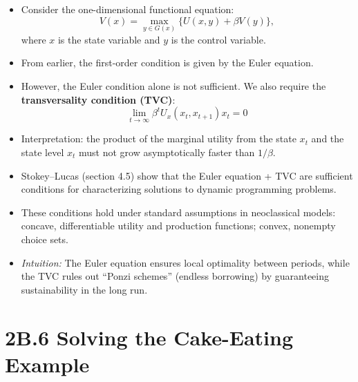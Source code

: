 \documentclass[12pt]{article}
\begin{document}
\begin{itemize}
    \item Consider the one-dimensional functional equation:
    \[
    V(x) = \max_{y \in G(x)} \{ U(x,y) + \beta V(y) \},
    \]
    where \( x \) is the state variable and \( y \) is the control variable.

    \item From earlier, the first-order condition is given by the Euler equation.

    \item However, the Euler condition alone is not sufficient.  
    We also require the \textbf{transversality condition (TVC)}:
    \[
    \lim_{t \to \infty} \beta^t U_x(x_t, x_{t+1}) x_t = 0
    \]

    \item Interpretation: the product of the marginal utility from the state \( x_t \) and the state level \( x_t \) must not grow asymptotically faster than \( 1/\beta \).

    \item Stokey–Lucas (section 4.5) show that the Euler equation + TVC are sufficient conditions for characterizing solutions to dynamic programming problems.

    \item These conditions hold under standard assumptions in neoclassical models: concave, differentiable utility and production functions; convex, nonempty choice sets.
    
    \item \textit{Intuition:} The Euler equation ensures local optimality between periods, while the TVC rules out “Ponzi schemes” (endless borrowing) by guaranteeing sustainability in the long run.
\end{itemize}

\section*{\noindent\textbf{2B.6 Solving the Cake-Eating Example}}
\end{document}

